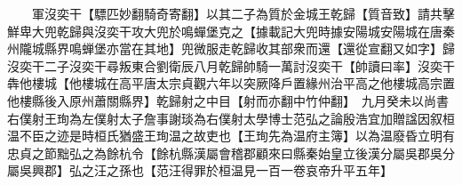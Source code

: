 　　軍沒奕干【驃匹妙翻騎奇寄翻】以其二子為質於金城王乾歸【質音致】請共擊鮮卑大兜乾歸與沒奕干攻大兜於鳴蟬堡克之【據載記大兜時據安陽城安陽城在唐秦州隴城縣界鳴蝉堡亦當在其地】兜微服走乾歸收其部衆而還【還從宣翻又如字】歸沒奕干二子沒奕干尋叛東合劉衛辰八月乾歸帥騎一萬討沒奕干【帥讀曰率】沒奕干犇他樓城【他樓城在高平唐太宗貞觀六年以突厥降戶置緣州治平高之他樓城高宗置他樓縣後入原州蕭關縣界】乾歸射之中目【射而亦翻中竹仲翻】　九月癸未以尚書右僕射王珣為左僕射太子詹事謝琰為右僕射太學博士范弘之論殷浩宜加贈諡因叙桓温不臣之迹是時桓氏猶盛王珣温之故吏也【王珣先為温府主簿】以為温廢昏立明有忠貞之節黜弘之為餘杭令【餘杭縣漢屬會稽郡顧來曰縣秦始皇立後漢分屬吳郡吳分屬吳興郡】弘之汪之孫也【范汪得罪於桓温見一百一卷哀帝升平五年】　